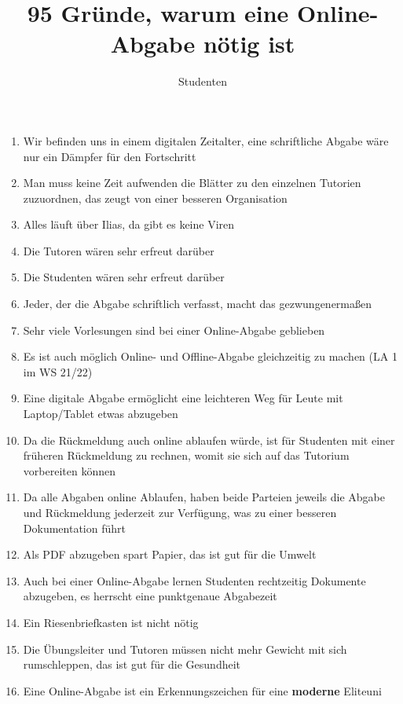 \documentclass[a4paper]{article}
\title{95 Gründe, warum eine Online-Abgabe nötig ist}
\author{Studenten}
\begin{document}
\maketitle

\begin{enumerate}

	\item Wir befinden uns in einem digitalen Zeitalter, eine schriftliche Abgabe wäre nur ein Dämpfer für den Fortschritt
	\item Man muss keine Zeit aufwenden die Blätter zu den einzelnen Tutorien zuzuordnen, das zeugt von einer besseren Organisation
	\item Alles läuft über Ilias, da gibt es keine Viren
	\item Die Tutoren wären sehr erfreut darüber
	\item Die Studenten wären sehr erfreut darüber
	\item Jeder, der die Abgabe schriftlich verfasst, macht das gezwungenermaßen
	\item Sehr viele Vorlesungen sind bei einer Online-Abgabe geblieben
	\item Es ist auch möglich Online- und Offline-Abgabe gleichzeitig zu machen (LA 1 im WS 21/22)
	\item Eine digitale Abgabe ermöglicht eine leichteren Weg für Leute mit Laptop/Tablet etwas abzugeben
	\item Da die Rückmeldung auch online ablaufen würde, ist für Studenten mit einer früheren Rückmeldung zu rechnen, womit sie sich auf das Tutorium vorbereiten können
	\item Da alle Abgaben online Ablaufen, haben beide Parteien jeweils die Abgabe und Rückmeldung jederzeit zur Verfügung, was zu einer besseren Dokumentation führt
	\item Als PDF abzugeben spart Papier, das ist gut für die Umwelt
	\item Auch bei einer Online-Abgabe lernen Studenten rechtzeitig Dokumente abzugeben, es herrscht eine punktgenaue Abgabezeit
	\item Ein Riesenbriefkasten ist nicht nötig
	\item Die Übungsleiter und Tutoren müssen nicht mehr Gewicht mit sich rumschleppen, das ist gut für die Gesundheit
	\item Eine Online-Abgabe ist ein Erkennungszeichen für eine \textbf{moderne} Eliteuni
\end{enumerate}
\end{document}
